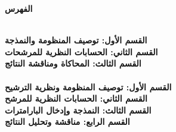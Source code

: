
\clearpage
\begin{center}
    {\fontsize{26}{32}\selectfont\bfseries الفهرس}
\end{center}
\vspace{40pt}

\dotfill\ {\large\bfseries \pageref{part1}} \\[0.7cm]

{\large\bfseries القسم الأول: توصيف المنظومة والنمذجة}\dotfill\ {\large\bfseries \pageref{part1:sec1}} \\[0.7cm]

{\large\bfseries القسم الثاني: الحسابات النظرية للمرشحات}\dotfill\ {\large\bfseries \pageref{part1:sec2}} \\[0.7cm]

{\large\bfseries القسم الثالث: المحاكاة ومناقشة النتائج}\dotfill\ {\large\bfseries \pageref{part1:sec3}} \\[0.7cm]


\dotfill\ {\large\bfseries \pageref{part2}} \\[0.7cm]

{\large\bfseries القسم الأول: توصيف المنظومة ونظرية الترشيح}\dotfill\ {\large\bfseries \pageref{part2:sec1}} \\[0.7cm]

{\large\bfseries القسم الثاني: الحسابات النظرية للمرشح}\dotfill\ {\large\bfseries \pageref{part2:sec2}} \\[0.7cm]

{\large\bfseries القسم الثالث: النمذجة وإدخال البارامترات}\dotfill\ {\large\bfseries \pageref{part2:sec3}} \\[0.7cm]

{\large\bfseries القسم الرابع: مناقشة وتحليل النتائج}\dotfill\ {\large\bfseries \pageref{part2:sec4}} \\[0.7cm]


\clearpage